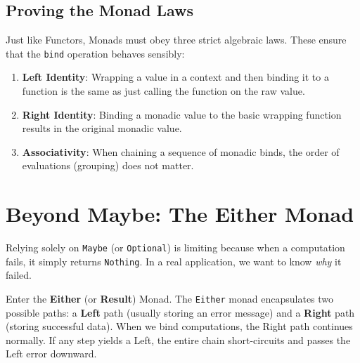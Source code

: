 \subsection{Proving the Monad Laws}
Just like Functors, Monads must obey three strict algebraic laws. These ensure that the \texttt{bind} operation behaves sensibly:
\begin{enumerate}
    \item \textbf{Left Identity}: Wrapping a value in a context and then binding it to a function is the same as just calling the function on the raw value.
    \item \textbf{Right Identity}: Binding a monadic value to the basic wrapping function results in the original monadic value.
    \item \textbf{Associativity}: When chaining a sequence of monadic binds, the order of evaluations (grouping) does not matter.
\end{enumerate}



\section{Beyond Maybe: The Either Monad}
Relying solely on \texttt{Maybe} (or \texttt{Optional}) is limiting because when a computation fails, it simply returns \texttt{Nothing}. In a real application, we want to know \textit{why} it failed.

Enter the \textbf{Either} (or \textbf{Result}) Monad. The \texttt{Either} monad encapsulates two possible paths: a \textbf{Left} path (usually storing an error message) and a \textbf{Right} path (storing successful data). When we bind computations, the Right path continues normally. If any step yields a Left, the entire chain short-circuits and passes the Left error downward.




